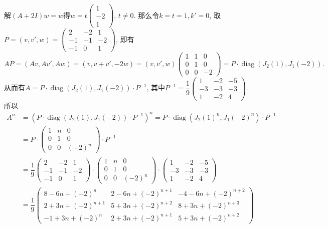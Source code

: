 解$(A + 2I) w = w$得$w = t \begin{pmatrix} 1 \\ -2 \\ 1 \end{pmatrix}$, $t \neq 0$. 那么令$k = t = 1, k' = 0$, 取$P = (v, v', w) = \begin{pmatrix} 2 & -2 & 1 \\ -1 & -1 & -2 \\ -1 & 0 & 1 \end{pmatrix}$, 即有
$$AP = (Av, Av', Aw) = (v, v+v', -2w) = (v, v', w) \begin{pmatrix} 1 & 1 & 0 \\ 0 & 1 & 0 \\ 0 & 0 & -2 \end{pmatrix} = P \cdot \operatorname{diag}(J_2(1), J_1(-2)).$$
从而有$A = P \cdot \operatorname{diag}(J_2(1), J_1(-2)) \cdot P^{-1}$, 其中$P^{-1} = \dfrac{1}{9} \begin{pmatrix} 1 & -2 & -5 \\ -3 & -3 & -3 \\ 1 & -2 & 4 \end{pmatrix}$. 所以
\begin{align*}
A^n & = (P \cdot \operatorname{diag}(J_2(1), J_1(-2)) \cdot P^{-1})^n = P \cdot \operatorname{diag}(J_2(1)^n, J_1(-2)^n) \cdot P^{-1} \\
& = P \cdot \begin{pmatrix} 1 & n & 0 \\ 0 & 1 & 0 \\ 0 & 0 & (-2)^n \end{pmatrix} \cdot P^{-1} \\
& = \dfrac{1}{9} \begin{pmatrix} 2 & -2 & 1 \\ -1 & -1 & -2 \\ -1 & 0 & 1 \end{pmatrix} \cdot \begin{pmatrix} 1 & n & 0 \\ 0 & 1 & 0 \\ 0 & 0 & (-2)^n \end{pmatrix} \cdot \begin{pmatrix} 1 & -2 & -5 \\ -3 & -3 & -3 \\ 1 & -2 & 4 \end{pmatrix} \\
& = \dfrac{1}{9} \begin{pmatrix} 8-6n+(-2)^{n} & 2-6n+(-2)^{n+1} & -4-6n+(-2)^{n+2} \\ 2+3n+(-2)^{n+1} & 5+3n+(-2)^{n+2} & 8+3n+(-2)^{n+3} \\ -1+3n+(-2)^{n} & 2+3n+(-2)^{n+1} & 5+3n+(-2)^{n+2} \end{pmatrix}
\end{align*}

